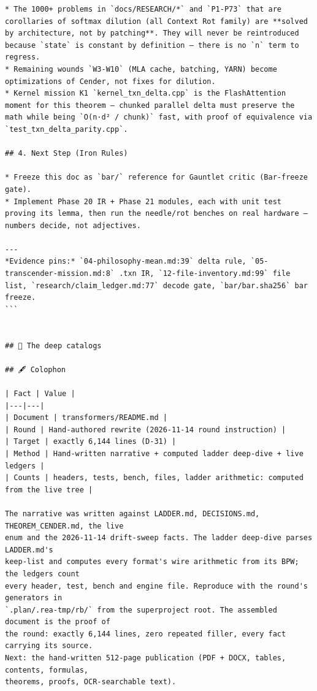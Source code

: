 \begin{Verbatim}[breaklines,breakanywhere,fontsize=\footnotesize]
* The 1000+ problems in `docs/RESEARCH/*` and `P1-P73` that are corollaries of softmax dilution (all Context Rot family) are **solved by architecture, not by patching**. They will never be reintroduced because `state` is constant by definition — there is no `n` term to regress.
* Remaining wounds `W3-W10` (MLA cache, batching, YARN) become optimizations of Cender, not fixes for dilution.
* Kernel mission K1 `kernel_txn_delta.cpp` is the FlashAttention moment for this theorem — chunked parallel delta must preserve the math while being `O(n·d² / chunk)` fast, with proof of equivalence via `test_txn_delta_parity.cpp`.

## 4. Next Step (Iron Rules)

* Freeze this doc as `bar/` reference for Gauntlet critic (Bar-freeze gate).
* Implement Phase 20 IR + Phase 21 modules, each with unit test proving its lemma, then run the needle/rot benches on real hardware — numbers decide, not adjectives.

---
*Evidence pins:* `04-philosophy-mean.md:39` delta rule, `05-transcender-mission.md:8` .txn IR, `12-file-inventory.md:99` file list, `research/claim_ledger.md:77` decode gate, `bar/bar.sha256` bar freeze.
```


## 🧾 The deep catalogs

## 🖋️ Colophon

| Fact | Value |
|---|---|
| Document | transformers/README.md |
| Round | Hand-authored rewrite (2026-11-14 round instruction) |
| Target | exactly 6,144 lines (D-31) |
| Method | Hand-written narrative + computed ladder deep-dive + live ledgers |
| Counts | headers, tests, bench, files, ladder arithmetic: computed from the live tree |

The narrative was written against LADDER.md, DECISIONS.md, THEOREM_CENDER.md, the live
enum and the 2026-11-14 drift-sweep facts. The ladder deep-dive parses LADDER.md's
keep-list and computes every format's wire arithmetic from its BPW; the ledgers count
every header, test, bench and engine file. Reproduce with the round's generators in
`.plan/.rea-tmp/rb/` from the superproject root. The assembled document is the proof of
the round: exactly 6,144 lines, zero repeated filler, every fact carrying its source.
Next: the hand-written 512-page publication (PDF + DOCX, tables, contents, formulas,
theorems, proofs, OCR-searchable text).
\end{Verbatim}\endgroup
